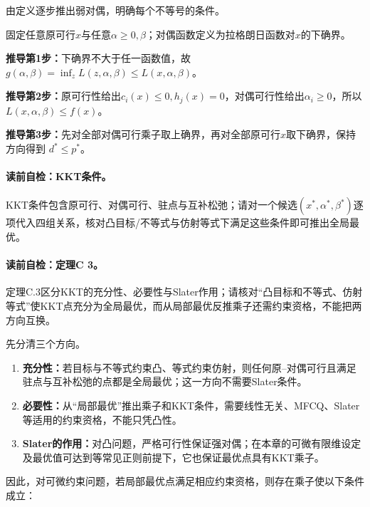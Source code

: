 \label{struct:V1-C07-CH16}

\begin{derivationgoalbox}
由定义逐步推出弱对偶，明确每个不等号的条件。
\end{derivationgoalbox}
\begin{derivationprepbox}
固定任意原可行$x$与任意$\alpha\ge0,\beta$；对偶函数定义为拉格朗日函数对$x$的下确界。
\end{derivationprepbox}
\textbf{推导第1步：}下确界不大于任一函数值，故 $g(\alpha,\beta)=\inf_zL(z,\alpha,\beta)\le L(x,\alpha,\beta)$。

\textbf{推导第2步：}原可行性给出$c_i(x)\le0,h_j(x)=0$，对偶可行性给出$\alpha_i\ge0$，所以$L(x,\alpha,\beta)\le f(x)$。

\textbf{推导第3步：}先对全部对偶可行乘子取上确界，再对全部原可行$x$取下确界，保持方向得到 $d^*\le p^*$。


\paragraph{读前自检：KKT条件。}KKT条件包含原可行、对偶可行、驻点与互补松弛；请对一个候选$(x^*,\alpha^*,\beta^*)$逐项代入四组关系，核对凸目标/不等式与仿射等式下满足这些条件即可推出全局最优。\par
\paragraph{读前自检：定理C 3。}定理C.3区分KKT的充分性、必要性与Slater作用；请核对“凸目标和不等式、仿射等式”使KKT点充分为全局最优，而从局部最优反推乘子还需约束资格，不能把两方向互换。\par

先分清三个方向。
\begin{enumerate}[leftmargin=2em]
  \item \textbf{充分性：}若目标与不等式约束凸、等式约束仿射，则任何原--对偶可行且满足驻点与互补松弛的点都是全局最优；这一方向不需要Slater条件。
  \item \textbf{必要性：}从“局部最优”推出乘子和KKT条件，需要线性无关、MFCQ、Slater等适用的约束资格，不能只凭凸性。
  \item \textbf{Slater的作用：}对凸问题，严格可行性保证强对偶；在本章的可微有限维设定及最优值可达到等常见正则前提下，它也保证最优点具有KKT乘子。
\end{enumerate}
因此，对可微约束问题，若局部最优点满足相应约束资格，则存在乘子使以下条件成立：
